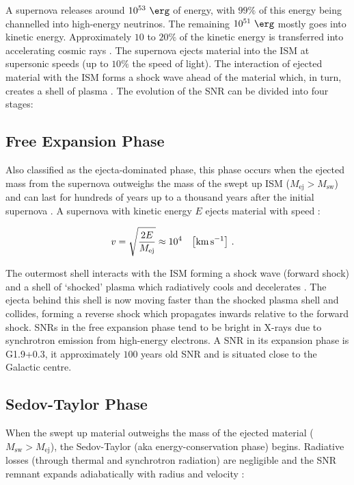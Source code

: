 A supernova releases around $10^{53}~\ergs$ of energy, with $99\%$ of this energy being channelled into high-energy neutrinos. The remaining $10^{51}~\ergs$ mostly goes into kinetic energy. Approximately $10$ to $20\%$ of the kinetic energy is transferred into accelerating cosmic rays \citep{2012SSRv..173..369H}. The supernova ejects material into the ISM at supersonic speeds (up to $10\%$ the speed of light). The interaction of ejected material with the ISM forms a shock wave ahead of the material which, in turn, creates a shell of plasma \citep{alma9928040781501811}. The evolution of the SNR can be divided into four stages:

\subsection{Free Expansion Phase}

Also classified as the ejecta-dominated phase, this phase occurs when the ejected mass from the supernova outweighs the mass of the swept up ISM ($M_\text{ej}>M_\text{sw}$) and can last for hundreds of years up to a thousand years after the initial supernova \citep{2008ARA&A..46...89R}. A supernova with kinetic energy $E$ ejects material with speed \citep{2022arXiv221102217B}:

\begin{equation}
    \begin{aligned}
        v&=\sqrt{\frac{2E}{M_\text{ej}}}\approx 10^4\quad\qty[\si{\kilo\meter\per\second}]\text{ .} 
    \end{aligned}
\end{equation}

The outermost shell interacts with the ISM forming a shock wave (forward shock) and a shell of `shocked' plasma which radiatively cools and decelerates  \citep{1972ARA&A..10..129W}. The ejecta behind this shell is now moving faster than the shocked plasma shell and collides, forming a reverse shock which propagates inwards relative to the forward shock. SNRs in the free expansion phase tend to be bright in X-rays due to synchrotron emission from high-energy electrons. A SNR in its expansion phase is \mbox{G1.9+0.3}, it approximately $100$ years old SNR and is situated close to the Galactic centre. \citep{2008ApJ...680L..41R}

\subsection{Sedov-Taylor Phase}

When the swept up material outweighs the mass of the ejected material ($M_\text{sw}>M_\text{ej}$), the Sedov-Taylor (aka energy-conservation phase) begins. Radiative losses (through thermal and synchrotron radiation) are negligible and the SNR remnant expands adiabatically with radius and velocity \citep{alma9947651801811}:


